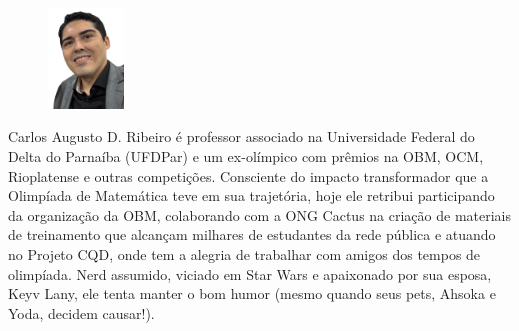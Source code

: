 \documentclass{hipatia}
\theoremstyle{definition} %
\begin{document}
%
%
%
\nocite{*}
\vfill




\pagebreak 

\begin{figure}
	\centering
	\includegraphics[width=2cm]{Carlos.jpeg}
\end{figure}\noindent
Carlos Augusto D. Ribeiro é professor associado na Universidade Federal do Delta do Parnaíba (UFDPar) e um ex-olímpico com prêmios na OBM, OCM, Rioplatense e outras competições. Consciente do impacto transformador que a Olimpíada de Matemática teve em sua trajetória, hoje ele retribui participando da organização da OBM, colaborando com a ONG Cactus na criação de materiais de treinamento que alcançam milhares de estudantes da rede pública e atuando no Projeto CQD, onde tem a alegria de trabalhar com amigos dos tempos de olimpíada. Nerd assumido, viciado em Star Wars e apaixonado por sua esposa, Keyv Lany, ele tenta manter o bom humor (mesmo quando seus pets, Ahsoka e Yoda, decidem causar!).
\end{document}
